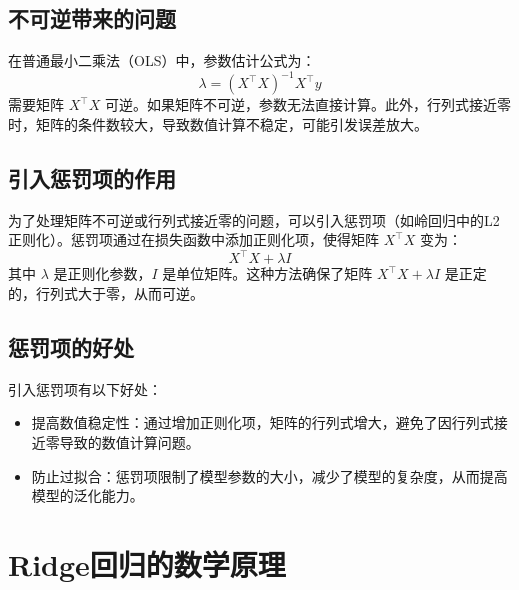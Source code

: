 \documentclass[lang=cn,11pt,a4paper]{elegantpaper}
\begin{document}
\subsection{不可逆带来的问题}
在普通最小二乘法（OLS）中，参数估计公式为：
\begin{equation}
\lambda = (X^\top X)^{-1} X^\top y
\end{equation}
需要矩阵 \( X^\top X \) 可逆。如果矩阵不可逆，参数无法直接计算。此外，行列式接近零时，矩阵的条件数较大，导致数值计算不稳定，可能引发误差放大。

\subsection{引入惩罚项的作用}
为了处理矩阵不可逆或行列式接近零的问题，可以引入惩罚项（如岭回归中的L2正则化）。惩罚项通过在损失函数中添加正则化项，使得矩阵 \( X^\top X \) 变为：
\begin{equation}
X^\top X + \lambda I
\end{equation}
其中 \( \lambda \) 是正则化参数，\( I \) 是单位矩阵。这种方法确保了矩阵 \( X^\top X + \lambda I \) 是正定的，行列式大于零，从而可逆。

\subsection{惩罚项的好处}
引入惩罚项有以下好处：
\begin{itemize}
    \item 提高数值稳定性：通过增加正则化项，矩阵的行列式增大，避免了因行列式接近零导致的数值计算问题。
    \item 防止过拟合：惩罚项限制了模型参数的大小，减少了模型的复杂度，从而提高模型的泛化能力。
\end{itemize}
\section{Ridge回归的数学原理}
\end{document}
